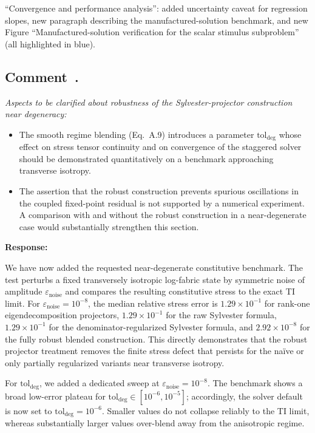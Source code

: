\documentclass[11pt,a4paper]{article}
\newcounter{reviewer}
\newcounter{comment}[reviewer]
\newcommand{\revcomment}[1]{%
  \refstepcounter{comment}%
  \subsection*{Comment~\thereviewer.\thecomment}%
  {\color{reviewerblue}\itshape #1}%
  \medskip
}
\newcommand{\response}{%
  \par\noindent\textbf{Response:}\par\noindent\color{responseblack}%
}
\newcommand{\change}{%
  \par\noindent{\color{blue}\textbf{Change in manuscript:}}\par\noindent\color{blue}%
}
\begin{document}
\change
``Convergence and performance analysis'': added uncertainty caveat for regression slopes, new paragraph describing the manufactured-solution benchmark, and new Figure ``Manufactured-solution verification for the scalar stimulus subproblem'' (all highlighted in blue).


\revcomment{Aspects to be clarified about robustness of the Sylvester-projector construction near degeneracy:
\begin{itemize}[nosep]
\item The smooth regime blending (Eq.~A.9) introduces a parameter $\mathrm{tol}_{\mathrm{deg}}$ whose effect on stress tensor continuity and on convergence of the staggered solver should be demonstrated quantitatively on a benchmark approaching transverse isotropy.
\item The assertion that the robust construction prevents spurious oscillations in the coupled fixed-point residual is not supported by a numerical experiment. A comparison with and without the robust construction in a near-degenerate case would substantially strengthen this section.
\end{itemize}}

\response
We have now added the requested near-degenerate constitutive benchmark. The test perturbs a fixed transversely isotropic log-fabric state by symmetric noise of amplitude $\varepsilon_{\mathrm{noise}}$ and compares the resulting constitutive stress to the exact TI limit. For $\varepsilon_{\mathrm{noise}}=10^{-8}$, the median relative stress error is $1.29\times 10^{-1}$ for rank-one eigendecomposition projectors, $1.29\times 10^{-1}$ for the raw Sylvester formula, $1.29\times 10^{-1}$ for the denominator-regularized Sylvester formula, and $2.92\times 10^{-8}$ for the fully robust blended construction. This directly demonstrates that the robust projector treatment removes the finite stress defect that persists for the na\"ive or only partially regularized variants near transverse isotropy.

For $\mathrm{tol}_{\mathrm{deg}}$, we added a dedicated sweep at $\varepsilon_{\mathrm{noise}}=10^{-8}$. The benchmark shows a broad low-error plateau for $\mathrm{tol}_{\mathrm{deg}}\in[10^{-6},10^{-5}]$; accordingly, the solver default is now set to $\mathrm{tol}_{\mathrm{deg}}=10^{-6}$. Smaller values do not collapse reliably to the TI limit, whereas substantially larger values over-blend away from the anisotropic regime.
\end{document}
